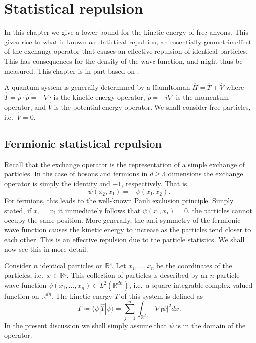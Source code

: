 
\chapter{Statistical repulsion}\label{chap:statistical repulsion}

In this chapter we give a lower bound for the kinetic energy of free anyons. This gives rise to what is known as statistical repulsion, an essentially geometric effect of the exchange operator that causes an effective repulsion of identical particles. This has consequences for the density of the wave function, and might thus be measured. This chapter is in part based on \cite{methmmp,lundholm-solovej,mancarella}.


A quantum system is generally determined by a Hamiltonian $\hat{H} = \hat{T} + \hat{V}$ where $\hat{T} = \hat{p}⋅\hat{p} = -∇²$ is the kinetic energy operator, $\hat{p} = -i∇$ is the momentum operator, and $\hat{V}$ is the potential energy operator. We shall consider free particles, i.e.\ $\hat{V} = 0.$






\section{Fermionic statistical repulsion}

Recall that the exchange operator is the representation of a simple exchange of particles. In the case of bosons and fermions in $d ≥ 3$ dimensions the exchange operator is simply the identity and $-1$, respectively. That is,
\begin{equation}
  ψ(x_2, x₁) = \pm ψ(x₁, x_2).
\end{equation}
For fermions, this leads to the well-known Pauli exclusion principle. Simply stated, if $x₁ = x_2$ it immediately follows that $ψ(x₁, x₁) = 0$, the particles cannot occupy the same position. More generally, the anti-symmetry of the fermionic wave function causes the kinetic energy to increase as the particles tend closer to each other. This is an effective repulsion due to the particle statistics. We shall now see this in more detail.

Consider $n$ identical particles on $ℝᵈ$. Let $x₁, …, x_n$ be the coordinates of the particles, i.e.\ $xⱼ ∈ ℝᵈ$. This collection of particles is described by an $n$-particle wave function $ψ(x₁, …, x_n) ∈ L^2(ℝ^{dn})$, i.e.\ a square integrable complex-valued function on $ℝ^{dn}$. The kinetic energy $T$ of this system is defined as
\begin{equation}
  T ≔ ⟨ψ|\hat{T}|ψ⟩ = ∑_{j=1}^n ∫_{ℝ^{dn}} |∇ⱼ ψ|^2 dx.
\end{equation}
In the present discussion we shall simply assume that $ψ$ is in the domain of the operator.

